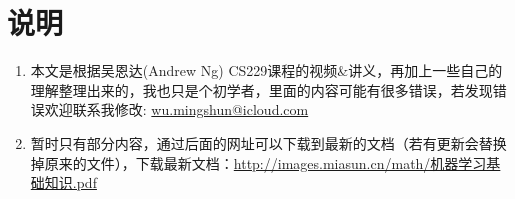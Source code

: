 \section*{说明}
\begin{enumerate}
	\item 本文是根据吴恩达(Andrew Ng) CS229课程的视频\&讲义，再加上一些自己的理解整理出来的，我也只是个初学者，里面的内容可能有很多错误，若发现错误欢迎联系我修改: \href{mailto:wu.mingshun@icloud.com}{wu.mingshun@icloud.com}
	\item 暂时只有部分内容，通过后面的网址可以下载到最新的文档（若有更新会替换掉原来的文件），下载最新文档：\href{http://images.miasun.cn/math/机器学习基础知识.pdf}{http://images.miasun.cn/math/机器学习基础知识.pdf}
	
\end{enumerate}



























